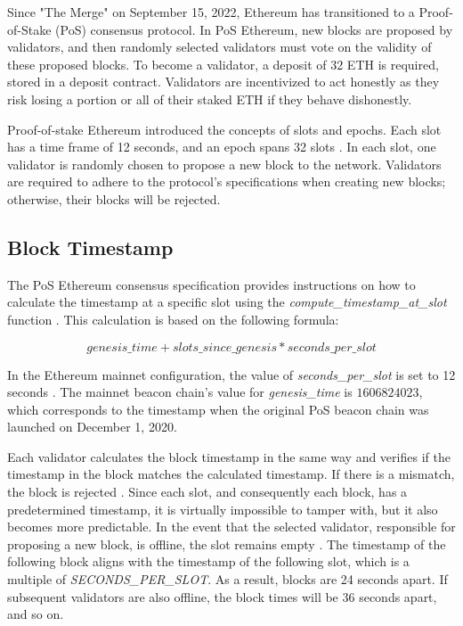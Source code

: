 Since "The Merge" on September 15, 2022, Ethereum has transitioned to a
Proof-of-Stake (PoS) consensus protocol. In PoS Ethereum, new blocks are
proposed by validators, and then randomly selected validators must vote on the
validity of these proposed blocks. To become a validator, a deposit of 32 ETH
is required, stored in a deposit contract. Validators are incentivized to act
honestly as they risk losing a portion or all of their staked ETH if they
behave dishonestly.

Proof-of-stake Ethereum introduced the concepts of slots and epochs. Each slot
has a time frame of 12 seconds, and an epoch spans 32 slots
\cite{seconds-per-slot-mainnet}\cite{seconds-per-slot-mainnet-doc}. In each
slot, one validator is randomly chosen to propose a new block to the network.
Validators are required to adhere to the protocol's specifications when
creating new blocks; otherwise, their blocks will be rejected.

\subsection{Block Timestamp}

The PoS Ethereum consensus specification provides instructions on how to
calculate the timestamp at a specific slot using the
\textit{compute\_timestamp\_at\_slot} function \cite{compute-timestamp-at-slot}.
This calculation is based on the following formula:

\begin{equation}
genesis\_time + slots\_since\_genesis *
seconds\_per\_slot
\end{equation}


In the Ethereum mainnet configuration, the value of \textit{seconds\_per\_slot} is set to
12 seconds \cite{seconds-per-slot-mainnet} \cite{seconds-per-slot-mainnet-doc}.
The mainnet beacon chain's value for \textit{genesis\_time} is $1606824023$, which
corresponds to the timestamp when the original PoS beacon chain was launched on
December 1, 2020.

Each validator calculates the block timestamp in the same way and verifies if
the timestamp in the block matches the calculated timestamp. If there is a
mismatch, the block is rejected \cite{process-execution-payload}. Since each
slot, and consequently each block, has a predetermined timestamp, it is
virtually impossible to tamper with, but it also becomes more predictable. In
the event that the selected validator, responsible for proposing a new block,
is offline, the slot remains empty \cite{validator-offline}. The timestamp of
the following block aligns with the timestamp of the following slot, which is a
multiple of \textit{SECONDS\_PER\_SLOT}. As a result, blocks are 24 seconds
apart. If subsequent validators are also offline, the block times will be 36
seconds apart, and so on.

